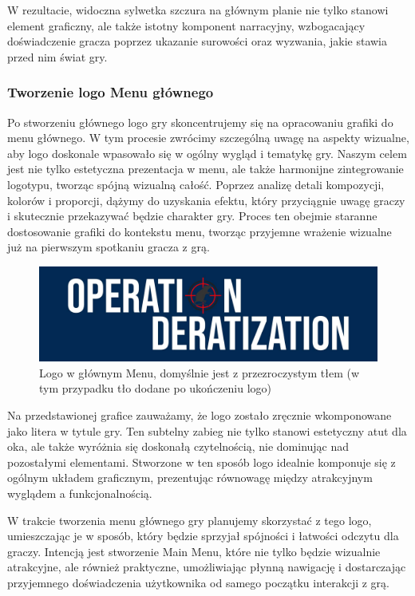 W rezultacie, widoczna sylwetka szczura na głównym planie nie tylko stanowi element graficzny, ale także istotny komponent narracyjny, wzbogacający doświadczenie gracza poprzez ukazanie surowości oraz wyzwania, jakie stawia przed nim świat gry.\\

\subsubsection{Tworzenie logo Menu głównego}

Po stworzeniu głównego logo gry skoncentrujemy się na opracowaniu grafiki do menu głównego. W tym procesie zwrócimy szczególną uwagę na aspekty wizualne, aby logo doskonale wpasowało się w ogólny wygląd i tematykę gry. Naszym celem jest nie tylko estetyczna prezentacja w menu, ale także harmonijne zintegrowanie logotypu, tworząc spójną wizualną całość. Poprzez analizę detali kompozycji, kolorów i proporcji, dążymy do uzyskania efektu, który przyciągnie uwagę graczy i skutecznie przekazywać będzie charakter gry. Proces ten obejmie staranne dostosowanie grafiki do kontekstu menu, tworząc przyjemne wrażenie wizualne już na pierwszym spotkaniu gracza z grą.
\begin{center}
\end{center}
\begin{figure}[h]
    \centering
    \includegraphics[scale=0.2]{Images/mainLogo.jpg}
    \caption{Logo w głównym Menu, domyślnie jest z przezroczystym tłem (w tym przypadku tło dodane po ukończeniu logo)}
\end{figure}

Na przedstawionej grafice zauważamy, że logo zostało zręcznie wkomponowane jako litera w tytule gry. Ten subtelny zabieg nie tylko stanowi estetyczny atut dla oka, ale także wyróżnia się doskonałą czytelnością, nie dominując nad pozostałymi elementami. Stworzone w ten sposób logo idealnie komponuje się z ogólnym układem graficznym, prezentując równowagę między atrakcyjnym wyglądem a funkcjonalnością.

W trakcie tworzenia menu głównego gry planujemy skorzystać z tego logo, umieszczając je w sposób, który będzie sprzyjał spójności i łatwości odczytu dla graczy. Intencją jest stworzenie Main Menu, które nie tylko będzie wizualnie atrakcyjne, ale również praktyczne, umożliwiając płynną nawigację i dostarczając przyjemnego doświadczenia użytkownika od samego początku interakcji z grą.\\


